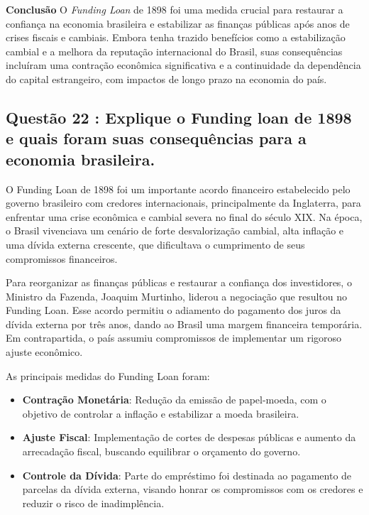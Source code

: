 \documentclass[a4paper,12pt]{article}[abntex2]
\begin{document}
\textbf{Conclusão}
O \textit{Funding Loan} de 1898 foi uma medida crucial para restaurar a confiança na economia brasileira e estabilizar as finanças públicas após anos de crises fiscais e cambiais. Embora tenha trazido benefícios como a estabilização cambial e a melhora da reputação internacional do Brasil, suas consequências incluíram uma contração econômica significativa e a continuidade da dependência do capital estrangeiro, com impactos de longo prazo na economia do país.

\subsection{\textbf{Questão 22 : Explique o Funding loan de 1898 e quais foram suas consequências para a economia brasileira.}}

O Funding Loan de 1898 foi um importante acordo financeiro estabelecido pelo governo brasileiro com credores internacionais, principalmente da Inglaterra, para enfrentar uma crise econômica e cambial severa no final do século XIX. Na época, o Brasil vivenciava um cenário de forte desvalorização cambial, alta inflação e uma dívida externa crescente, que dificultava o cumprimento de seus compromissos financeiros.

Para reorganizar as finanças públicas e restaurar a confiança dos investidores, o Ministro da Fazenda, Joaquim Murtinho, liderou a negociação que resultou no Funding Loan. Esse acordo permitiu o adiamento do pagamento dos juros da dívida externa por três anos, dando ao Brasil uma margem financeira temporária. Em contrapartida, o país assumiu compromissos de implementar um rigoroso ajuste econômico.

As principais medidas do Funding Loan foram:
\begin{itemize}
    \item \textbf{Contração Monetária}: Redução da emissão de papel-moeda, com o objetivo de controlar a inflação e estabilizar a moeda brasileira.
    \item \textbf{Ajuste Fiscal}: Implementação de cortes de despesas públicas e aumento da arrecadação fiscal, buscando equilibrar o orçamento do governo.
    \item \textbf{Controle da Dívida}: Parte do empréstimo foi destinada ao pagamento de parcelas da dívida externa, visando honrar os compromissos com os credores e reduzir o risco de inadimplência.
\end{itemize}
\end{document}
